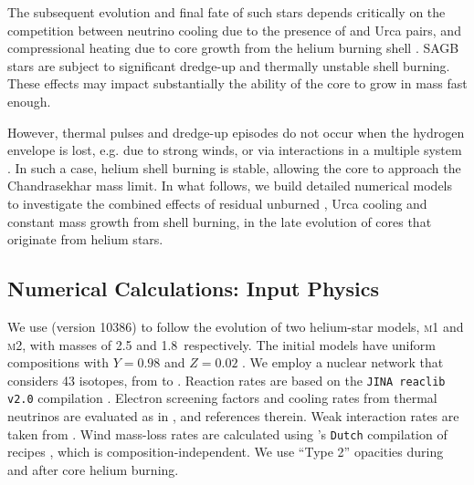 \documentclass[twocolumn]{aa}
\begin{document}
The subsequent evolution and final fate of such stars depends  critically on the competition 
between neutrino cooling due to the presence of  and 
 Urca pairs, and compressional heating due to core growth from the helium burning shell \citep{Schwab:2017epw}. 
SAGB stars are subject to significant dredge-up  and 
thermally unstable shell burning. 
These effects may impact substantially the ability of the core to grow in mass fast enough. 

However, thermal pulses and dredge-up episodes do not 
occur when the hydrogen envelope 
is lost, e.g. due to strong winds, or via  interactions   in a multiple system \citep{poelarends2007,Poelarends:2007ip,Woosley:2019sdf}.  
In such a case, helium shell burning is stable, allowing  
the core to approach the Chandrasekhar mass limit. 
In what follows, we build detailed numerical models to 
investigate the combined effects 
of residual unburned , Urca cooling and constant mass growth from shell 
burning, in the late evolution of \one cores that originate from helium stars. 

\subsection{Numerical Calculations: Input Physics}\label{sec:2.1}
We use \mesa (version 10386) to follow the evolution of two helium-star models, \textsc{m1} and \textsc{m2}, with  masses of 2.5 and 1.8\msun\ respectively. 
The initial models have uniform compositions with $Y=0.98$ and $Z=0.02$ \citep[solar abundances are taken from ][]{grevesse1998}. We employ a nuclear network that considers 43  isotopes, from  to . Reaction rates are based on the \texttt{JINA reaclib v2.0} compilation \citep{cyburt2010}. Electron screening factors and cooling rates from thermal neutrinos are evaluated as in \cite{Farmer:2015afs}, and references therein. 
Weak interaction rates are taken from \cite{Suzuki:2015iry}. 
Wind mass-loss rates are calculated using \mesa's \texttt{Dutch} compilation of recipes  \citep{Paxton:2013pj},  which is composition-independent. We use ``Type 2'' opacities during and after core helium burning.
\end{document}
